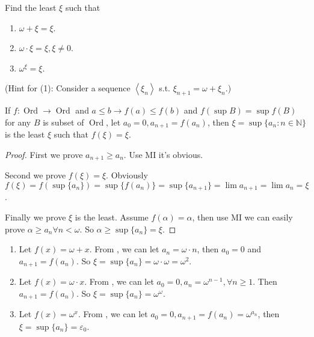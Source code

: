 \documentclass{ctexart}
\DeclareMathOperator{\ord}{Ord}
\newcommand{\N}{\mathbb{N}}
\begin{document}
 
 \begin{problem}
 Find the least $\xi$ such that
 \begin{enumerate}[label=\alph*,ref=\theproblem.\alph*]
  \item  $\omega+\xi=\xi$.
  \item  $\omega \cdot \xi=\xi, \xi \neq 0$.
  \item  $\omega^{\xi}=\xi$.
 \end{enumerate}
 (Hint for (1): Consider a sequence $\left\langle\xi_n\right\rangle$ s.t. $\xi_{n+1}=\omega+\xi_n$.)
 \end{problem}
\begin{lemma}\label{lem:f}
 If $f:\ord\to\ord$ and $a\leq b\to f(a)\leq f(b)$ and $f(\sup B)=\sup f(B)$ for any $B$ is subset of $\ord$, let $a_0=0,a_{n+1}=f(a_n)$, then $\xi=\sup\{a_n:n\in\N\}$ is the least $\xi$ such that $f(\xi)=\xi$. 
\end{lemma}
\begin{proof}
 First we prove $a_{n+1}\geq a_n$. Use MI it's obvious. 

 Second we prove $f(\xi)=\xi$. Obviously $f(\xi)=f(\sup\{a_n\})=\sup\{f(a_n)\}=\sup\{a_{n+1}\}=\lim a_{n+1}=\lim a_n=\xi$.
 
 Finally we prove $\xi$ is the least. Assume $f(\alpha)=\alpha$, then use MI we can easily prove $\alpha\geq a_n\forall n<\omega$. So $\alpha\geq \sup\{a_n\}=\xi$. 
\end{proof}

\begin{solution}
 \begin{enumerate}
  \item Let $f(x)=\omega+x$. From , we can let $a_n=\omega\cdot n$, then $a_{0}=0$ and $a_{n+1}=f(a_n)$. So $\xi=\sup\{a_n\}=\omega\cdot \omega=\omega^2$. 
  \item Let $f(x)=\omega\cdot x$. From , we can let $a_0=0,a_n=\omega^{n-1},\forall n\geq 1$. Then $a_{n+1}=f(a_n)$. So $\xi=\sup\{a_n\}=\omega^\omega$. 
  \item Let $f(x)=\omega^x$. From , we can let $a_0=0,a_{n+1}=f(a_n)=\omega^{a_n}$, then $\xi=\sup\{a_n\}=\varepsilon_0$. 
  \end{enumerate}
\end{solution}
\end{document}
